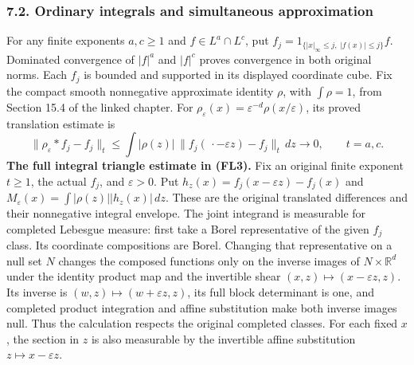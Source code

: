 \documentclass[
  11pt,
]{article}
\begin{document}
\subsubsection{7.2. Ordinary integrals and simultaneous
approximation}\label{ordinary-integrals-and-simultaneous-approximation}

For any finite exponents \(a,c\geq1\) and \(f\in L^a\cap L^c\), put
\(f_j=1_{\{|x|_\infty\leq j,\ |f(x)|\leq j\}}f\). Dominated convergence
of \(|f|^a\) and \(|f|^c\) proves convergence in both original norms.
Each \(f_j\) is bounded and supported in its displayed coordinate cube.
Fix the compact smooth nonnegative approximate identity \(\rho\), with
\(\int\rho=1\), from Section 15.4 of the linked chapter. For
\(\rho_\varepsilon(x)=\varepsilon^{-d}\rho(x/\varepsilon)\), its proved
translation estimate is \[
 \|\rho_\varepsilon*f_j-f_j\|_t
 \leq\int|\rho(z)|\,\|f_j(\,\cdot-\varepsilon z)-f_j\|_t\,dz
 \longrightarrow0,\qquad t=a,c.                                \tag{FL3}
\] \textbf{The full integral triangle estimate in (FL3).} Fix an
original finite exponent \(t\geq1\), the actual \(f_j\), and
\(\varepsilon>0\). Put \(h_z(x)=f_j(x-\varepsilon z)-f_j(x)\) and
\(M_\varepsilon(x)=\int|\rho(z)||h_z(x)|\,dz\). These are the original
translated differences and their nonnegative integral envelope. The
joint integrand is measurable for completed Lebesgue measure: first take
a Borel representative of the given \(f_j\) class. Its coordinate
compositions are Borel. Changing that representative on a null set \(N\)
changes the composed functions only on the inverse images of
\(N\times\mathbb R^d\) under the identity product map and the invertible
shear \((x,z)\mapsto(x-\varepsilon z,z)\). Its inverse is
\((w,z)\mapsto(w+\varepsilon z,z)\), its full block determinant is one,
and completed product integration and affine substitution make both
inverse images null. Thus the calculation respects the original
completed classes. For each fixed \(x\), the section in \(z\) is also
measurable by the invertible affine substitution
\(z\mapsto x-\varepsilon z\).
\end{document}
